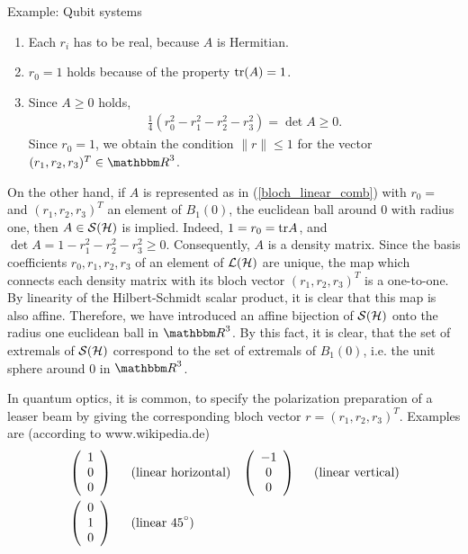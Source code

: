 \begin{section}{Example: Qubit systems}
\begin{enumerate}
    \item Each $r_i$ has to be real, because $A$ is Hermitian. 
    \item $r_0 = 1$ holds because of the property $\mathrm{tr}(A) = 1$. 
    \item Since $A \geq 0$ holds, 
     \begin{align}
      \frac{1}{4}(r_0^2 - r_1^2 - r_2^2 - r_3^2) = \det A \geq 0.
     \end{align}
     Since $r_0 = 1$, we obtain the condition $\|r\| \leq 1$ for the vector $(r_1,r_2,r_3)^T \in \bbmR^3$. 
   \end{enumerate}
   On the other hand, if $A$ is represented as in (\ref{bloch_linear_comb}) with $r_0 = $ and $(r_1,r_2,r_3)^T$ an element of $B_1(0)$, the euclidean ball around $0$ with radius one, then $A \in {\mathcal S}({\mathcal H})$ is 
   implied. Indeed, $1 = r_0 = \mathrm{tr} A$, and $\det A = 1 - r_1^2 - r_2^2 - r_3^2 \geq 0$. Consequently, $A$ is a density matrix. Since the basis coefficients $r_0,r_1,r_2,r_3$ of an element of ${\mathcal L}({\mathcal H})$
   are unique, the map which connects each density matrix with its bloch vector $(r_1,r_2,r_3)^T$ is a one-to-one. By linearity of the Hilbert-Schmidt scalar product, it is clear that this map is also 
   affine. Therefore, we have introduced an affine bijection of ${\mathcal S}({\mathcal H})$ onto the radius one euclidean ball in $\bbmR^3$. By this fact, it is clear, that the set of extremals of ${\mathcal S}({\mathcal H})$ correspond to
   the set of extremals of $B_1(0)$, i.e. the unit sphere around $0$ in $\bbmR^3$.
   \begin{remark}
    In quantum optics, it is common, to specify the polarization preparation of a leaser beam by giving the corresponding bloch vector $r = (r_1,r_2,r_3)^T$. Examples are (according to www.wikipedia.de)
    \begin{align*} 
    &  \left(\begin{array}{c} 1 \\ 0 \\ 0 \end{array}\right) \hspace{.5cm} \text{(linear horizontal)}  
    & \left(\begin{array}{c} -1 \\ 0 \\ 0 \end{array}\right) \hspace{.5cm} \text{(linear vertical)}   \\
    &  \left(\begin{array}{c} 0 \\ 1 \\ 0 \end{array}\right) \hspace{.5cm} \text{(linear 45}^{\circ}\text{)}  

\end{align*}
\end{remark}
\end{section}
